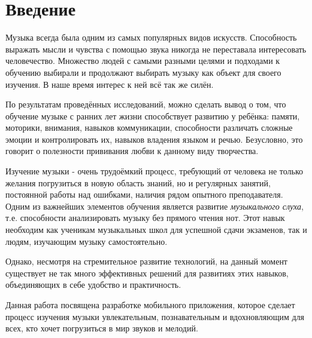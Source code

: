 \chapter*{Введение}
\setlength\parindent{1.5em} 
\par 
Музыка всегда была одним из самых популярных видов искусств. Способность выражать мысли и чувства с помощью звука никогда не переставала интересовать человечество. Множество людей с самыми разными целями и подходами к обучению выбирали и продолжают выбирать музыку как объект для своего изучения. В наше время интерес к ней всё так же силён\cite{thamprasert2023network}.

По результатам проведённых исследований\cite{dumont2017music}, можно сделать вывод о том, что обучение музыке с ранних лет жизни способствует развитию у ребёнка: памяти, моторики, внимания, навыков коммуникации, способности различать сложные эмоции и контролировать их,
навыков владения языком и речью. Безусловно, это говорит о полезности прививания любви к данному виду творчества.\par

Изучение музыки - очень трудоёмкий процесс, требующий от человека не только желания погрузиться в новую область знаний, но и регулярных занятий, постоянной работы над ошибками, наличия рядом опытного преподавателя. Одним из важнейших элементов обучения является развитие \textit{музыкального слуха}, т.е. способности анализировать музыку без прямого чтения нот. Этот навык необходим как ученикам музыкальных школ для успешной сдачи экзаменов, так и людям, изучающим музыку самостоятельно.\par

Однако, несмотря на стремительное развитие технологий, на данный момент существует не так много эффективных решений для развитиях этих навыков, объединяющих в себе удобство и практичность.\par

Данная работа посвящена разработке мобильного приложения, которое сделает процесс изучения музыки увлекательным, познавательным и вдохновляющим для всех, кто хочет погрузиться в мир звуков и мелодий.